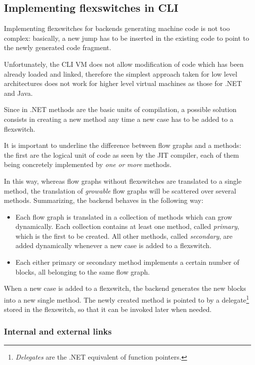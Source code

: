\subsection{Implementing flexswitches in CLI}
\label{sec:flexswitches-cli}

Implementing flexswitches for backends generating machine code is
not too complex: basically, a new jump has to be inserted in the
existing code to point to the newly generated code fragment.

Unfortunately, the CLI VM does not allow modification of code which
has been already loaded and linked, therefore the simplest approach
taken for low level architectures does not work for higher level 
virtual machines as those for .NET and Java.

Since in .NET methods are the basic units of compilation, a possible
solution consists in creating a new method 
any time a new case has to be added to a flexswitch.

It is important to underline the difference between flow graphs and a methods:
the first are the logical unit of code as seen by the JIT compiler, each of
them being concretely implemented by \emph{one or more} methods.

In this way, whereas flow graphs without flexswitches are translated to a
single method, the translation of \emph{growable} flow graphs will be
scattered over several methods.  Summarizing, the backend behaves in the
following way:
\begin{itemize}
\item Each flow graph is translated in a collection of methods which
  can grow dynamically. Each collection contains at least one
  method, called \emph{primary}, which is the first to be created.
  All other methods, called \emph{secondary}, are added dynamically 
  whenever a new case is added to a flexswitch.

\item Each either primary or secondary method implements a certain
  number of blocks, all belonging to the same flow graph.
\end{itemize} 

When a new case is added to a flexswitch, the backend generates the new blocks
into a new single method.  The newly created method is pointed to by a
delegate\footnote{\emph{Delegates} are the .NET equivalent of function
  pointers.} stored in the flexswitch, so that it can be invoked later when
needed.

\subsubsection{Internal and external links}


